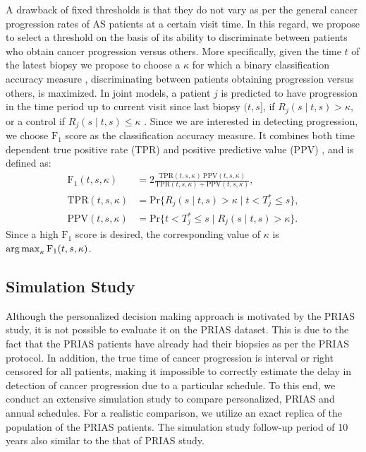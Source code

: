 A drawback of fixed thresholds is that they do not vary as per the general cancer progression rates of AS patients at a certain visit time. In this regard, we propose to select a threshold on the basis of its ability to discriminate between patients who obtain cancer progression versus others. More specifically, given the time $t$ of the latest biopsy we propose to choose a $\kappa$ for which a binary classification accuracy measure \citep{lopez2014optimalcutpoints}, discriminating between patients obtaining progression versus others, is maximized. In joint models, a patient $j$ is predicted to have progression in the time period up to current visit since last biopsy $(t, s]$, if $R_j(s \mid t,s) > \kappa$, or a control if $R_j(s \mid t,s) \leq \kappa$ \cite{rizopoulosJMbayes, landmarking2017}. Since we are interested in detecting progression, we choose $\mbox{F}_1$ score as the classification accuracy measure. It combines both time dependent true positive rate (TPR) and positive predictive value (PPV) \cite{landmarking2017}, and is defined as:
\begin{align*}
\mbox{F}_1(t,  s, \kappa) &= 2\frac{\mbox{TPR}(t,  s, \kappa)\ \mbox{PPV}(t,  s, \kappa)}{\mbox{TPR}(t,  s, \kappa) + \mbox{PPV}(t,  s, \kappa)},\\
\mbox{TPR}(t,  s, \kappa) &= \mbox{Pr}\big\{R_j(s \mid t,s) > \kappa \mid t < T^*_j \leq s\big\},\\
\mbox{PPV}(t,  s, \kappa) &= \mbox{Pr}\big\{t < T^*_j \leq s \mid R_j(s \mid t,s) > \kappa \big\}.
\end{align*}
Since a high $\mbox{F}_1$ score is desired, the corresponding value of $\kappa$ is $\operatorname{arg\,max}_{\kappa} \mbox{F}_1(t, s, \kappa)$.

\subsection{Simulation Study}
Although the personalized decision making approach is motivated by the PRIAS study, it is not possible to evaluate it on the PRIAS dataset. This is due to the fact that the PRIAS patients have already had their biopsies as per the PRIAS protocol. In addition, the true time of cancer progression is interval or right censored for all patients, making it impossible to correctly estimate the delay in detection of cancer progression due to a particular schedule. To this end, we conduct an extensive simulation study to compare personalized, PRIAS and annual schedules. For a realistic comparison, we utilize an exact replica of the population of the PRIAS patients. The simulation study follow-up period of 10 years also similar to the that of PRIAS study.

